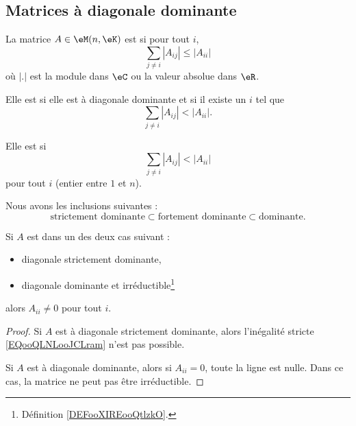 \subsection{Matrices à diagonale dominante}

\begin{definition}
    La matrice \( A\in \eM(n,\eK)\) est  si pour tout \( i\),
    \begin{equation}
        \sum_{j\neq i}| A_{ij} |\leq | A_{ii} |
    \end{equation}
    où \( | . |\) est la module dans \( \eC\) ou la valeur absolue dans \( \eR\). 

    Elle est  si elle est à diagonale dominante et si il existe un \( i\) tel que
    \begin{equation}
        \sum_{j\neq i}| A_{ij} |< | A_{ii} |.
    \end{equation}

    Elle est  si 
    \begin{equation}        \label{EQooQLNLooJCLram}
        \sum_{j\neq i}| A_{ij} |< | A_{ii} |
    \end{equation}
    pour tout \( i\) (entier entre \( 1\) et \( n\)).
\end{definition}

Nous avons les inclusions suivantes :
\begin{equation}
    \text{strictement dominante}\subset\text{fortement dominante}\subset\text{dominante}.
\end{equation}

\begin{lemma}       \label{LEMooMQAEooUCkQxU}
    Si \( A\) est dans un des deux cas suivant :
    \begin{itemize}
        \item diagonale strictement dominante,
        \item diagonale dominante et irréductible\footnote{Définition \ref{DEFooXIREooQtlzkO}.}
    \end{itemize}
    alors \( A_{ii}\neq 0\) pour tout \( i\).
\end{lemma}

\begin{proof}
    Si \( A\) est à diagonale strictement dominante, alors l'inégalité stricte \eqref{EQooQLNLooJCLram} n'est pas possible.

    Si \( A\) est à diagonale dominante, alors si \( A_{ii}=0\), toute la ligne est nulle. Dans ce cas, la matrice ne peut pas être irréductible.
\end{proof}

